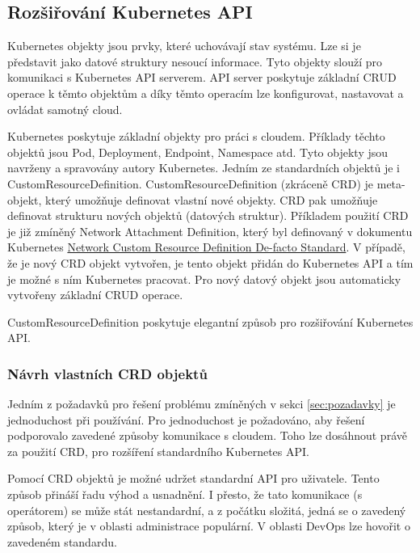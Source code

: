 

\subsection{Rozšiřování Kubernetes API}\label{CRD}
Kubernetes objekty jsou prvky, které uchovávají stav systému. Lze si je představit jako datové struktury nesoucí informace. Tyto objekty slouží pro komunikaci s Kubernetes API serverem. API server poskytuje základní CRUD operace k těmto objektům a díky těmto operacím lze konfigurovat, nastavovat a ovládat samotný cloud.

Kubernetes poskytuje základní objekty pro práci s cloudem. Příklady těchto objektů jsou Pod, Deployment, Endpoint, Namespace atd. Tyto objekty jsou navrženy a spravovány autory Kubernetes. Jedním ze standardních objektů je i CustomResourceDefinition. CustomResourceDefinition (zkráceně CRD) je meta-objekt, který umožňuje definovat vlastní nové objekty. CRD pak umožňuje definovat strukturu nových objektů (datových struktur). Příkladem použití CRD je již zmíněný Network Attachment Definition, který byl definovaný v dokumentu Kubernetes \href{https://github.com/k8snetworkplumbingwg/multi-net-spec}{Network Custom Resource Definition De-facto Standard}. V případě, že je nový CRD objekt vytvořen, je tento objekt přidán do Kubernetes API a tím je možné s ním Kubernetes pracovat. Pro nový datový objekt jsou automaticky vytvořeny základní CRUD operace.

CustomResourceDefinition poskytuje elegantní způsob pro rozšiřování Kubernetes API.

\subsubsection{Návrh vlastních CRD objektů}\label{CRDDEF}
Jedním z požadavků pro řešení problému zmíněných v sekci \ref{sec:pozadavky} je jednoduchost při používání. Pro jednoduchost je požadováno, aby řešení podporovalo zavedené způsoby komunikace s cloudem. Toho lze dosáhnout právě za použití CRD, pro rozšíření standardního Kubernetes API.

Pomocí CRD objektů je možné udržet standardní API pro uživatele. Tento způsob přináší řadu výhod a usnadnění. I přesto, že tato komunikace (s operátorem) se může stát nestandardní, a z počátku složitá, jedná se o zavedený způsob, který je v oblasti administrace  populární. V oblasti DevOps lze hovořit o zavedeném standardu. 

